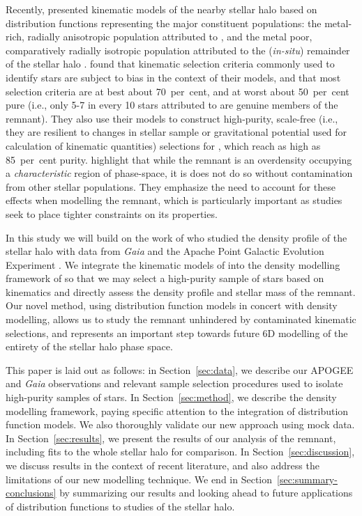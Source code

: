 Recently, \textcite[][hereafter LBM22]{lane22} presented kinematic models of the nearby stellar halo based on distribution functions representing the major constituent populations: the metal-rich, radially anisotropic population attributed to \gse, and the metal poor, comparatively radially isotropic population attributed to the (\textit{in-situ}) remainder of the stellar halo \parencite[e.g.][]{belokurov18,haywood18}. \cite{lane22} found that kinematic selection criteria commonly used to identify \gse stars are subject to bias in the context of their models, and that most selection criteria are at best about 70~per~cent, and at worst about 50~per~cent pure (i.e., only 5-7 in every 10 stars attributed to \gse are genuine members of the \gse remnant). They also use their models to construct high-purity, scale-free (i.e., they are resilient to changes in stellar sample or gravitational potential used for calculation of kinematic quantities) selections for \gse, which reach as high as 85~per~cent purity. \cite{lane22} highlight that while the \gse remnant is an overdensity occupying a \textit{characteristic} region of phase-space, it is does not do so without contamination from other stellar populations. They emphasize the need to account for these effects when modelling the \gse remnant, which is particularly important as studies seek to place tighter constraints on its properties.

In this study we will build on the work of \textcite[][hereafter MB20]{mackereth20} who studied the density profile of the stellar halo with data from \textit{Gaia} and the Apache Point Galactic Evolution Experiment \parencite[APOGEE][]{apogee}. We integrate the kinematic models of \cite{lane22} into the density modelling framework of \cite{mackereth20} so that we may select a high-purity sample of \gse stars based on kinematics and directly assess the density profile and stellar mass of the remnant. Our novel method, using distribution function models in concert with density modelling, allows us to study the \gse remnant unhindered by contaminated kinematic selections, and represents an important step towards future 6D modelling of the entirety of the stellar halo phase space.

This paper is laid out as follows: in Section~\ref{sec:data}, we describe our APOGEE and \textit{Gaia} observations and relevant sample selection procedures used to isolate high-purity samples of \gse stars. In Section~\ref{sec:method}, we describe the density modelling framework, paying specific attention to the integration of distribution function models. We also thoroughly validate our new approach using mock data. In Section~\ref{sec:results}, we present the results of our analysis of the \gse remnant, including fits to the whole stellar halo for comparison. In Section~\ref{sec:discussion}, we discuss results in the context of recent literature, and also address the limitations of our new modelling technique. We end in Section~\ref{sec:summary-conclusions} by summarizing our results and looking ahead to future applications of distribution functions to studies of the stellar halo.

